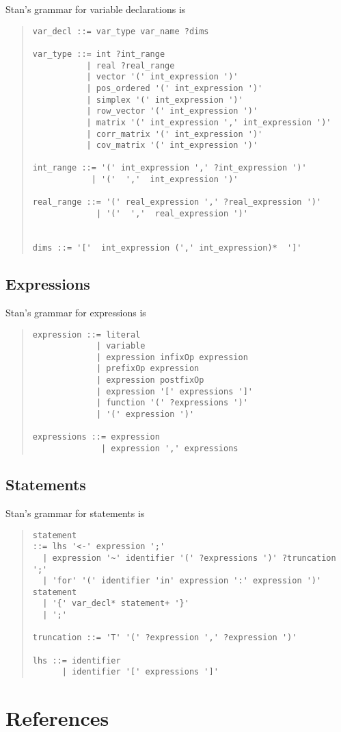 \documentclass[10pt]{report}
\newcommand{\Stan}{Stan\xspace}
\begin{document}
\Stan's grammar for variable declarations is
%
\begin{quote}
\begin{Verbatim}
var_decl ::= var_type var_name ?dims

var_type ::= int ?int_range
           | real ?real_range
           | vector '(' int_expression ')'
           | pos_ordered '(' int_expression ')'
           | simplex '(' int_expression ')'
           | row_vector '(' int_expression ')'
           | matrix '(' int_expression ',' int_expression ')'
           | corr_matrix '(' int_expression ')'
           | cov_matrix '(' int_expression ')'

int_range ::= '(' int_expression ',' ?int_expression ')'
            | '('  ','  int_expression ')'

real_range ::= '(' real_expression ',' ?real_expression ')'
             | '('  ','  real_expression ')'


dims ::= '['  int_expression (',' int_expression)*  ']'
\end{Verbatim}
\end{quote}

\section{Expressions}

\Stan's grammar for expressions is 
%
\begin{quote}
\begin{Verbatim}
expression ::= literal
             | variable
             | expression infixOp expression
             | prefixOp expression
             | expression postfixOp
             | expression '[' expressions ']'
             | function '(' ?expressions ')'
             | '(' expression ')'

expressions ::= expression
              | expression ',' expressions
\end{Verbatim}
\end{quote}

\section{Statements}

\Stan's grammar for statements is
%
\begin{quote}
\begin{Verbatim}
statement 
::= lhs '<-' expression ';'
  | expression '~' identifier '(' ?expressions ')' ?truncation ';'
  | 'for' '(' identifier 'in' expression ':' expression ')' statement
  | '{' var_decl* statement+ '}'
  | ';'

truncation ::= 'T' '(' ?expression ',' ?expression ')' 

lhs ::= identifier
      | identifier '[' expressions ']'

\end{Verbatim}
\end{quote}







\chapter*{References}
\end{document}
